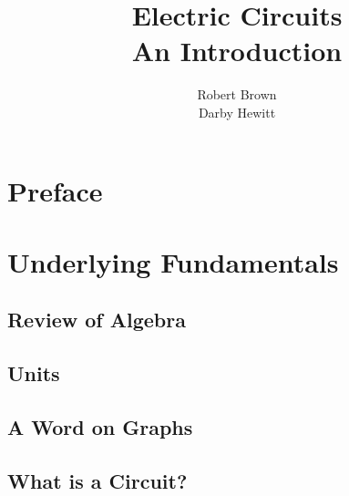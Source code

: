\documentclass[a4paper,11pt]{book}
\title{\Huge \textbf{Electric Circuits}  \\ \huge An Introduction}
\author{Robert Brown \\ Darby Hewitt}
\newenvironment{dedication}
{
   \cleardoublepage
   \thispagestyle{empty}
   \vspace*{\stretch{1}}
   \hfill\begin{minipage}[t]{0.66\textwidth}
   \raggedright
}
{
   \end{minipage}
   \vspace*{\stretch{3}}
   \clearpage
}
\begin{document}
\frontmatter
\maketitle


\tableofcontents

\mainmatter


\chapter*{Preface}


\chapter{Underlying Fundamentals}
\section{Review of Algebra}


\section{Units} \label{sec:PrelimUnits}

\section{A Word on Graphs}


\section{What is a Circuit?}
\end{document}
